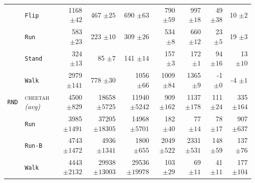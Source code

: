 \documentclass{article}
\theoremstyle{plain}
\theoremstyle{definition}
\theoremstyle{remark}
\newcommand{\domainavg}[1]{\textsc{#1} \textit{(avg)}}
\begin{document}
\begin{table}[H]
\begin{tabular}{l l r r r r r r r}
& \hspace{.5em} \texttt{Flip} & 1168 ${\scriptstyle \pm 42}$ & 467 ${\scriptstyle \pm 25}$ & 690 ${\scriptstyle \pm 63}$ & 790 ${\scriptstyle \pm 59}$ & 997 ${\scriptstyle \pm 18}$ & 49 ${\scriptstyle \pm 38}$ & 10 ${\scriptstyle \pm 2}$ \\
& \hspace{.5em} \texttt{Run} & 583 ${\scriptstyle \pm 23}$ & 223 ${\scriptstyle \pm 10}$ & 309 ${\scriptstyle \pm 26}$ & 534 ${\scriptstyle \pm 8}$ & 660 ${\scriptstyle \pm 12}$ & 23 ${\scriptstyle \pm 5}$ & 19 ${\scriptstyle \pm 3}$ \\
& \hspace{.5em} \texttt{Stand} & 324 ${\scriptstyle \pm 13}$ & 85 ${\scriptstyle \pm 7}$ & 141 ${\scriptstyle \pm 14}$ & 157 ${\scriptstyle \pm 3}$ & 172 ${\scriptstyle \pm 1}$ & 94 ${\scriptstyle \pm 16}$ & 13 ${\scriptstyle \pm 10}$ \\
& \hspace{.5em} \texttt{Walk} & 2979 ${\scriptstyle \pm 141}$ & 778 ${\scriptstyle \pm 30}$ & 1056 ${\scriptstyle \pm 66}$ & 1009 ${\scriptstyle \pm 84}$ & 1365 ${\scriptstyle \pm 9}$ & -1 ${\scriptstyle \pm 0}$ & -4 ${\scriptstyle \pm 1}$ \\
\addlinespace
\midrule
 \rowcolor{gray!15}  \cellcolor{white} \texttt{RND} & \domainavg{cheetah} & 4500 ${\scriptstyle \pm 829}$ & 18658 ${\scriptstyle \pm 5725}$ & 11940 ${\scriptstyle \pm 5242}$ & 909 ${\scriptstyle \pm 162}$ & 1137 ${\scriptstyle \pm 178}$ & 111 ${\scriptstyle \pm 24}$ & 335 ${\scriptstyle \pm 164}$ \\
& \hspace{.5em} \texttt{Run} & 3985 ${\scriptstyle \pm 1491}$ & 37205 ${\scriptstyle \pm 18305}$ & 14968 ${\scriptstyle \pm 5701}$ & 182 ${\scriptstyle \pm 40}$ & 77 ${\scriptstyle \pm 14}$ & 78 ${\scriptstyle \pm 17}$ & 907 ${\scriptstyle \pm 637}$ \\
& \hspace{.5em} \texttt{Run-B} & 4743 ${\scriptstyle \pm 1472}$ & 4936 ${\scriptstyle \pm 1341}$ & 1800 ${\scriptstyle \pm 655}$ & 2049 ${\scriptstyle \pm 522}$ & 2331 ${\scriptstyle \pm 531}$ & 148 ${\scriptstyle \pm 59}$ & 137 ${\scriptstyle \pm 76}$ \\
& \hspace{.5em} \texttt{Walk} & 4443 ${\scriptstyle \pm 2132}$ & 29938 ${\scriptstyle \pm 13003}$ & 29536 ${\scriptstyle \pm 19978}$ & 103 ${\scriptstyle \pm 29}$ & 69 ${\scriptstyle \pm 11}$ & 41 ${\scriptstyle \pm 11}$ & 177 ${\scriptstyle \pm 104}$ \\

\end{tabular}
\end{table}
\end{document}
